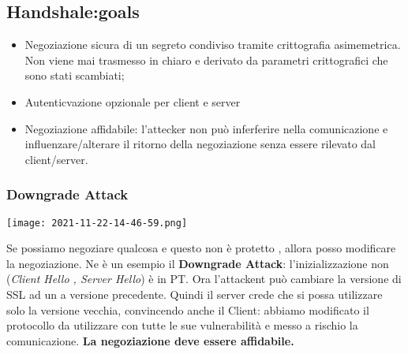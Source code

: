 \documentclass{article}
\theoremstyle{remark}
\begin{document}
\subsection{Handshale:goals}
\begin{itemize}
	\item Negoziazione sicura di un segreto condiviso tramite crittografia asimemetrica. Non viene mai trasmesso in chiaro e derivato
	      da parametri crittografici che sono stati scambiati;
	\item Autenticvazione opzionale per client e server
	\item Negoziazione affidabile: l'attecker non può inferferire nella comunicazione e influenzare/alterare il ritorno della negoziazione senza essere rilevato dal client/server.
\end{itemize}
\subsubsection{Downgrade Attack}
\begin{center}
	\texttt{[image: 2021-11-22-14-46-59.png]}
\end{center}
Se possiamo negoziare qualcosa e questo non è protetto , allora posso modificare la negoziazione. Ne è un esempio
il \textbf{Downgrade Attack}: l'inizializzazione non (\emph{Client Hello , Server Hello}) è in PT. Ora l'attackent può cambiare la
versione di SSL ad un a versione precedente. Quindi il server crede che si possa utilizzare solo la versione vecchia, convincendo anche
il Client: abbiamo modificato il protocollo da utilizzare con tutte le sue vulnerabilità e messo a rischio la comunicazione.
\textbf{La negoziazione deve essere affidabile.}
\end{document}
